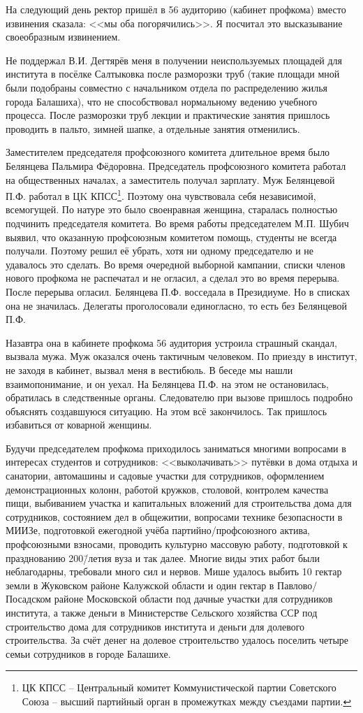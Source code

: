 На следующий день ректор пришёл в 56 аудиторию (кабинет профкома) вместо извинения сказала: <<мы оба погорячились>>. Я посчитал это высказывание своеобразным извинением.

Не поддержал В.И. Дегтярёв меня в получении неиспользуемых площадей для института в посёлке Салтыковка после разморозки труб (такие площади мной были подобраны совместно с начальником отдела по распределению жилья города Балашиха), что не способствовал нормальному ведению учебного процесса. После разморозки труб лекции и практические занятия пришлось проводить в пальто, зимней шапке, а отдельные занятия отменились.

Заместителем председателя профсоюзного комитета длительное время было Белянцева Пальмира Фёдоровна. Председатель профсоюзного комитета работал на общественных началах, а заместитель получал зарплату. Муж Белянцевой П.Ф. работал в ЦK КПСС\footnote{ЦК КПСС \--- Центральный комитет Коммунистической партии Советского Союза \--- высший партийный орган в промежутках между съездами партии.}. Поэтому она чувствовала себя независимой, всемогущей. По натуре это было своенравная женщина, старалась полностью подчинить председателя комитета. Во время работы председателем М.П. Шубич выявил, что оказанную профсоюзным комитетом помощь, студенты не всегда получали. Поэтому решил её убрать, хотя ни одному председателю и не удавалось это сделать. Во время очередной выборной кампании, списки членов нового профкома не распечатал и не огласил, а сделал это во время перерыва. После перерыва огласил. Белянцева П.Ф. восседала в Президиуме. Но в списках она не значилась. Делегаты проголосовали единогласно, то есть без Белянцевой П.Ф. 

Назавтра она в кабинете профкома 56 аудитория устроила страшный скандал, вызвала мужа. Муж оказался очень тактичным человеком. По приезду в институт, не заходя в кабинет, вызвал меня в вестибюль. В беседе мы нашли взаимопонимание, и он уехал. На Белянцева П.Ф. на этом не остановилась, обратилась в следственные органы. Следователю при вызове пришлось подробно объяснять создавшуюся ситуацию. На этом всё закончилось. Так пришлось избавиться от коварной женщины. 

Будучи председателем профкома приходилось заниматься многими вопросами в интересах студентов и сотрудников: <<выколачивать>> путёвки в дома отдыха и санатории, автомашины и садовые участки для сотрудников, оформлением демонстрационных колонн, работой кружков, столовой, контролем качества пищи, выбиванием участка и капитальных вложений для строительства дома для сотрудников, состоянием дел в общежитии, вопросами технике безопасности в МИИЗе, подготовкой ежегодной учёба партийно\-/профсоюзного актива, профсоюзными взносами, проводить культурно массовую работу, подготовкой к празднованию 200\=/летия вуза и так далее. Многие виды этих работ были неблагодарны, требовали много сил и нервов. Мише удалось выбить 10 гектар земли в Жуковском районе Калужской области и один гектар в Павлово\-/Посадском районе Московской области под дачные участки для сотрудников института, а также деньги в Министерстве Сельского хозяйства ССР под строительство дома для сотрудников института и деньги для долевого строительства. За счёт денег на долевое строительство удалось поселить четыре семьи сотрудников в городе Балашихе.

